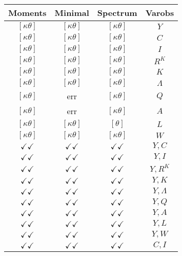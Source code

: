 \documentclass[a4paper,10pt]{article}
\begin{document}
\centering
\begin{longtable}{|c|c|c|c|}
\hline
Moments & Minimal & Spectrum & Varobs \\
\hline
$[\kappa \theta ]$ & $[\kappa \theta ]$ & $[\kappa \theta ]$ & ${Y}$ \\
\hline
$[\kappa \theta ]$ & $[\kappa \theta ]$ & $[\kappa \theta ]$ & ${C}$ \\
\hline
$[\kappa \theta ]$ & $[\kappa \theta ]$ & $[\kappa \theta ]$ & ${I}$ \\
\hline
$[\kappa \theta ]$ & $[\kappa \theta ]$ & $[\kappa \theta ]$ & ${R^{K}}$ \\
\hline
$[\kappa \theta ]$ & $[\kappa \theta ]$ & $[\kappa \theta ]$ & ${K}$ \\
\hline
$[\kappa \theta ]$ & $[\kappa \theta ]$ & $[\kappa \theta ]$ & ${\Lambda}$ \\
\hline
$[\kappa \theta ]$ & err & $[\kappa \theta ]$ & ${Q}$ \\
\hline
$[\kappa \theta ]$ & err & $[\kappa \theta ]$ & ${A}$ \\
\hline
$[\kappa \theta ]$ & $[\kappa \theta ]$ & $[\theta ]$ & ${L}$ \\
\hline
$[\kappa \theta ]$ & $[\kappa \theta ]$ & $[\kappa \theta ]$ & ${W}$ \\
\hline
$\checkmark\checkmark$ & $\checkmark\checkmark$ & $\checkmark\checkmark$ & ${Y},{C}$ \\
\hline
$\checkmark\checkmark$ & $\checkmark\checkmark$ & $\checkmark\checkmark$ & ${Y},{I}$ \\
\hline
$\checkmark\checkmark$ & $\checkmark\checkmark$ & $\checkmark\checkmark$ & ${Y},{R^{K}}$ \\
\hline
$\checkmark\checkmark$ & $\checkmark\checkmark$ & $\checkmark\checkmark$ & ${Y},{K}$ \\
\hline
$\checkmark\checkmark$ & $\checkmark\checkmark$ & $\checkmark\checkmark$ & ${Y},{\Lambda}$ \\
\hline
$\checkmark\checkmark$ & $\checkmark\checkmark$ & $\checkmark\checkmark$ & ${Y},{Q}$ \\
\hline
$\checkmark\checkmark$ & $\checkmark\checkmark$ & $\checkmark\checkmark$ & ${Y},{A}$ \\
\hline
$\checkmark\checkmark$ & $\checkmark\checkmark$ & $\checkmark\checkmark$ & ${Y},{L}$ \\
\hline
$\checkmark\checkmark$ & $\checkmark\checkmark$ & $\checkmark\checkmark$ & ${Y},{W}$ \\
\hline
$\checkmark\checkmark$ & $\checkmark\checkmark$ & $\checkmark\checkmark$ & ${C},{I}$ \\

\end{longtable}
\end{document}
